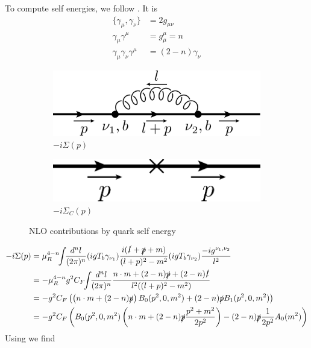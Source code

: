 To compute self energies, we follow \cite{Bojak:2000eu}.
It is
\begin{align}
\{\gamma_\mu,\gamma_\nu\} &= 2g_{\mu\nu}\\
\gamma_\mu\gamma^\mu &= g_\mu^\mu = n \\
\gamma_\mu\gamma_\nu\gamma^\mu &= (2-n)\gamma_\nu
\end{align}
\begin{figure}[ht!]
	\begin{subfigure}[t]{.4\textwidth}
		\includegraphics[width=\textwidth]{pyfeyn/nlo-v-seq}
		\caption{$-i\Sigma(p)$}
	\end{subfigure}\hspace{.15\textwidth}%
	\begin{subfigure}[t]{.4\textwidth}
		\includegraphics[width=\textwidth]{pyfeyn/nlo-v-seqc}
		\caption{$-i\Sigma_C(p)$}
	\end{subfigure}
	\caption{NLO contributions by quark self energy}\label{fig:FeynNLOvseq}
\end{figure}
\begin{align}
-i\Sigma(p) &= \mu_R^{4-n}\!\!\int\!\!\frac{d^nl}{(2\pi)^n}(igT_b \gamma_{\nu_1})\frac{i(\slashed{l}+\slashed{p}+m)}{(l+p)^2-m^2}(igT_b \gamma_{\nu_2})\frac{-ig^{\nu_1,\nu_2}}{l^2}\\
 &=-\mu_R^{4-n}g^2C_F\!\!\int\!\!\frac{d^nl}{(2\pi)^n}\frac{n\cdot m+(2-n)\slashed{p}+(2-n)\slashed{l}}{l^2((l+p)^2-m^2)}\\
 &=-g^2C_F\left(\left(n\cdot m+(2-n)\slashed{p}\right)B_0(p^2,0,m^2)+(2-n)\slashed{p}B_1(p^2,0,m^2)\right)\\
 &=-g^2C_F\left(B_0(p^2,0,m^2)\left(n\cdot m+(2-n)\slashed{p}\frac{p^2+m^2}{2p^2}\right)-(2-n)\slashed{p}\frac 1{2p^2}A_0(m^2)\right)
\end{align}
Using \cite{Bojak:2000eu} we find

